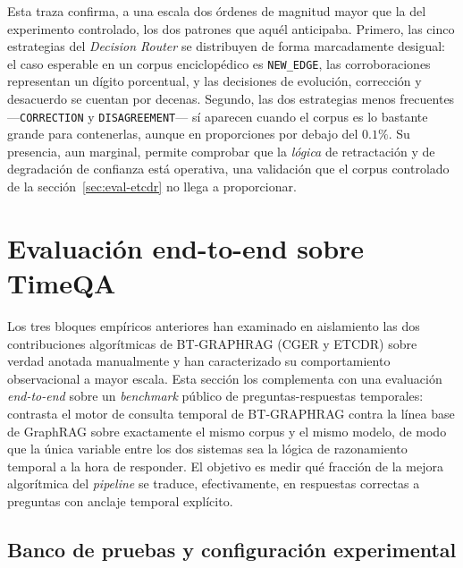Esta traza confirma, a una escala dos órdenes de magnitud mayor que la del experimento controlado, los dos patrones que aquél anticipaba. Primero, las cinco estrategias del \emph{Decision Router} se distribuyen de forma marcadamente desigual: el caso esperable en un corpus enciclopédico es \texttt{NEW\_EDGE}, las corroboraciones representan un dígito porcentual, y las decisiones de evolución, corrección y desacuerdo se cuentan por decenas. Segundo, las dos estrategias menos frecuentes ---\texttt{CORRECTION} y \texttt{DISAGREEMENT}--- sí aparecen cuando el corpus es lo bastante grande para contenerlas, aunque en proporciones por debajo del $0.1\%$. Su presencia, aun marginal, permite comprobar que la \emph{lógica} de retractación y de degradación de confianza está operativa, una validación que el corpus controlado de la sección~\ref{sec:eval-etcdr} no llega a proporcionar.

\section{Evaluación end-to-end sobre TimeQA}\label{sec:eval-timeqa}

Los tres bloques empíricos anteriores han examinado en aislamiento las dos contribuciones algorítmicas de BT-GRAPHRAG (CGER y ETCDR) sobre verdad anotada manualmente y han caracterizado su comportamiento observacional a mayor escala. Esta sección los complementa con una evaluación \emph{end-to-end} sobre un \emph{benchmark} público de preguntas-respuestas temporales: contrasta el motor de consulta temporal de BT-GRAPHRAG contra la línea base de GraphRAG sobre exactamente el mismo corpus y el mismo modelo, de modo que la única variable entre los dos sistemas sea la lógica de razonamiento temporal a la hora de responder. El objetivo es medir qué fracción de la mejora algorítmica del \emph{pipeline} se traduce, efectivamente, en respuestas correctas a preguntas con anclaje temporal explícito.

\subsection{Banco de pruebas y configuración experimental}\label{sec:eval-timeqa-setup}


